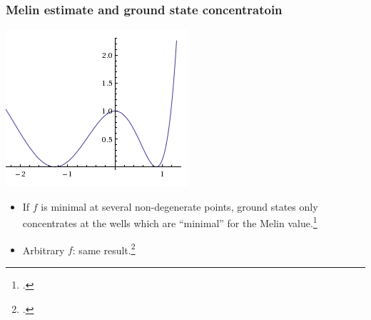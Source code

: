 \documentclass[mathserif]{beamer}
\begin{document}
\begin{frame}
  \frametitle{Melin estimate and ground state concentratoin}
  \begin{minipage}[l]{0.3\linewidth}\vspace{1em}\begin{center}
    \includegraphics[width=0.8\linewidth]{wells.png}\\
  \end{center}
\end{minipage}%
  \begin{minipage}[r]{0.65\linewidth}
    \begin{itemize}
    \item If $f$ is minimal at several non-degenerate points, ground
      states only concentrates at the wells which are ``minimal'' for
      the Melin value.\footcite{deleporte_low-energy_2016-1}\vspace{1em}
    \item<2-> Arbitrary $f$: same result.\footcite{deleporte_low-energy_2017}
    \end{itemize}
  \end{minipage}
\end{frame}
\end{document}
